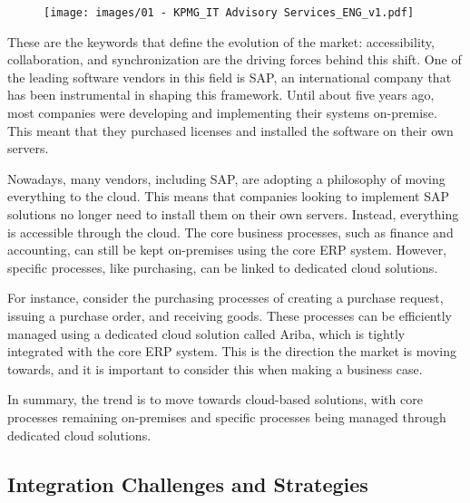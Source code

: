 \begin{figure}[!h]
  \centering
  \texttt{[image: images/01 - KPMG\_IT Advisory Services\_ENG\_v1.pdf]}
\end{figure}

These are the keywords that define the evolution of the
market: accessibility, collaboration, and synchronization are the
driving forces behind this shift. One of the leading software vendors in
this field is SAP, an international company that has been instrumental
in shaping this framework. Until about five years ago, most companies
were developing and implementing their systems on-premise. This meant
that they purchased licenses and installed the software on their own
servers.

Nowadays, many vendors, including SAP, are adopting a philosophy of
moving everything to the cloud. This means that companies looking to
implement SAP solutions no longer need to install them on their own
servers. Instead, everything is accessible through the cloud. The core
business processes, such as finance and accounting, can still be kept
on-premises using the core ERP system. However, specific processes, like
purchasing, can be linked to dedicated cloud solutions.

For instance, consider the purchasing processes of creating a purchase request, issuing a purchase order, and receiving goods. These processes can be efficiently managed using a dedicated cloud solution called Ariba\footnotemark{}, which is tightly integrated with the core ERP system. This is the direction the market is moving towards, and it is important to consider this when making a business case.

In summary, the trend is to move towards cloud-based solutions, with
core processes remaining on-premises and specific processes being
managed through dedicated cloud solutions.



\subsection{Integration Challenges and
  Strategies}\label{integration-challenges-and-strategies}

